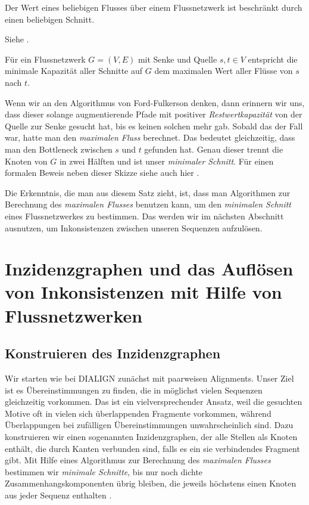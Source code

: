 \begin{lemma}
	Der Wert eines beliebigen Flusses über einem Flussnetzwerk ist beschränkt durch einen beliebigen Schnitt.
\end{lemma}

\begin{beweis}
	Siehe \cite{clrs09}.
\end{beweis}

\begin{satz}
	Für ein Flussnetzwerk $G = (V,E)$ mit Senke und Quelle $s, t \in V$ entspricht die minimale Kapazität aller Schnitte auf $G$ dem maximalen Wert aller Flüsse von $s$ nach $t$. 
\end{satz} 

\begin{beweis}
	Wenn wir an den Algorithmus von Ford-Fulkerson denken, dann erinnern wir uns, dass dieser solange augmentierende Pfade mit positiver \emph{Restwertkapazität} von der Quelle zur Senke gesucht hat, bis es keinen solchen mehr gab. Sobald das der Fall war, hatte man den \emph{maximalen Fluss} berechnet. Das bedeutet gleichzeitig, dass man den Bottleneck zwischen $s$ und $t$ gefunden hat. Genau dieser trennt die Knoten von $G$ in zwei Hälften und ist unser \emph{minimaler Schnitt}. Für einen formalen Beweis neben dieser Skizze siehe auch hier \cite{clrs09}.
\end{beweis} 

Die Erkenntnis, die man aus diesem Satz zieht, ist, dass man Algorithmen zur Berechnung des \emph{maximalen Flusses} benutzen kann, um den \emph{minimalen Schnitt} eines Flussnetzwerkes zu bestimmen. Das werden wir im nächsten Abschnitt ausnutzen, um Inkonsistenzen zwischen unseren Sequenzen aufzulösen.

\section{Inzidenzgraphen und das Auflösen von Inkonsistenzen mit Hilfe von Flussnetzwerken}

\subsection{Konstruieren des Inzidenzgraphen}

Wir starten wie bei DIALIGN	zunächst mit paarweisen Alignments. Unser Ziel ist es Übereinstimmungen zu finden, die in möglichst vielen Sequenzen gleichzeitig vorkommen. Das ist ein vielversprechender Ansatz, weil die gesuchten Motive oft in vielen sich überlappenden Fragmente vorkommen, während Überlappungen bei zufälligen Übereinstimmungen unwahrscheinlich sind. Dazu konstruieren wir einen sogenannten Inzidenzgraphen, der alle Stellen als Knoten enthält, die durch Kanten verbunden sind, falls es ein sie verbindendes Fragment gibt. Mit Hilfe eines Algorithmus zur Berechnung des \emph{maximalen Flusses} bestimmen wir \emph{minimale Schnitte}, bis nur noch dichte Zusammenhangskomponenten übrig bleiben, die jeweils höchstens einen Knoten aus jeder Sequenz enthalten \citep{cpm10}.

